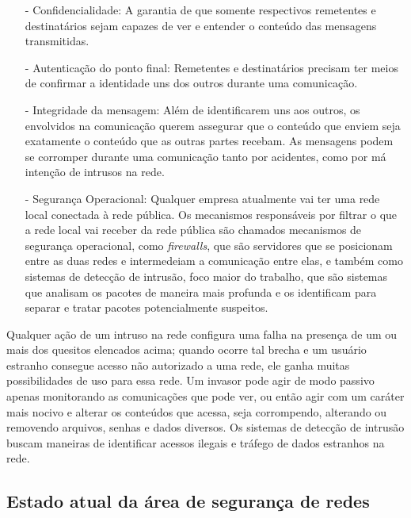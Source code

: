 \begin{itemize}
\item[-] Confidencialidade: A garantia de que somente respectivos remetentes e destinatários sejam capazes de ver e entender o conteúdo das mensagens transmitidas.
\item[-] Autenticação do ponto final: Remetentes e destinatários precisam ter meios de confirmar a identidade uns dos outros durante uma comunicação.
\item[-] Integridade da mensagem: Além de identificarem uns aos outros, os envolvidos na comunicação querem assegurar que o conteúdo que enviem seja exatamente o conteúdo que as outras partes recebam. As mensagens podem se corromper durante uma comunicação tanto por acidentes, como por má intenção de intrusos na rede.
\item[-] Segurança Operacional: Qualquer empresa atualmente vai ter uma rede local conectada à rede pública. Os mecanismos responsáveis por filtrar o que a rede local vai receber da rede pública são chamados mecanismos de segurança operacional, como \textit{firewalls}, que são servidores que se posicionam entre as duas redes e intermedeiam a comunicação entre elas, e também como sistemas de detecção de intrusão, foco maior do trabalho, que são sistemas que analisam os pacotes de maneira mais profunda e os identificam para separar e tratar pacotes potencialmente suspeitos.
\end{itemize}

Qualquer ação de um intruso na rede configura uma falha na presença de um ou
mais dos quesitos elencados acima; quando ocorre tal brecha e um usuário
estranho consegue acesso não autorizado a uma rede, ele ganha muitas
possibilidades de uso para essa rede. Um invasor pode agir de modo passivo
apenas monitorando as comunicações que pode ver, ou então agir com um caráter
mais nocivo e alterar os conteúdos que acessa, seja corrompendo, alterando ou
removendo arquivos, senhas e dados diversos. Os sistemas de detecção de
intrusão buscam maneiras de identificar acessos ilegais e tráfego de dados
estranhos na rede. \subsection{Estado atual da área de segurança de redes}
\label{sub:estado_da_arte}

